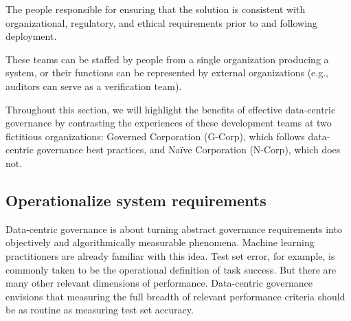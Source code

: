 \begin{definition}
The people responsible for ensuring that the solution is consistent with organizational, regulatory, and ethical requirements prior to and following deployment.
\end{definition}

These teams can be staffed by people from a single organization producing a system, or their functions can be represented by external organizations (e.g., auditors can serve as a verification team).

Throughout this section, we will highlight the benefits of effective data-centric governance by contrasting the experiences of these development teams at two fictitious organizations: Governed Corporation (G-Corp), which follows data-centric governance best practices, and Na\"{i}ve Corporation (N-Corp), which does not.



\subsection{Operationalize system requirements} 

Data-centric governance is about turning abstract governance requirements into objectively and algorithmically measurable phenomena. Machine learning practitioners are already familiar with this idea. Test set error, for example, is commonly taken to be the operational definition of task success. But there are many other relevant dimensions of performance. Data-centric governance envisions that measuring the full breadth of relevant performance criteria should be as routine as measuring test set accuracy.


